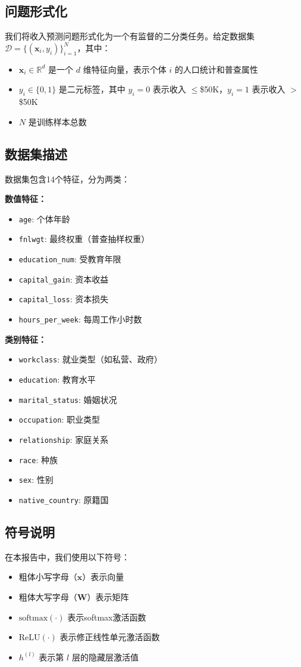 \documentclass[conference]{IEEEtran}
\begin{document}
\subsection{问题形式化}
我们将收入预测问题形式化为一个有监督的二分类任务。给定数据集 $\mathcal{D} = \{(\mathbf{x}_i, y_i)\}_{i=1}^{N}$，其中：
\begin{itemize}
    \item $\mathbf{x}_i \in \mathbb{R}^d$ 是一个 $d$ 维特征向量，表示个体 $i$ 的人口统计和普查属性
    \item $y_i \in \{0, 1\}$ 是二元标签，其中 $y_i = 0$ 表示收入 $\leq$\$50K，$y_i = 1$ 表示收入 $>$\$50K
    \item $N$ 是训练样本总数
\end{itemize}

\subsection{数据集描述}
数据集包含14个特征，分为两类：

\textbf{数值特征：}
\begin{itemize}
    \item \texttt{age}: 个体年龄
    \item \texttt{fnlwgt}: 最终权重（普查抽样权重）
    \item \texttt{education\_num}: 受教育年限
    \item \texttt{capital\_gain}: 资本收益
    \item \texttt{capital\_loss}: 资本损失
    \item \texttt{hours\_per\_week}: 每周工作小时数
\end{itemize}

\textbf{类别特征：}
\begin{itemize}
    \item \texttt{workclass}: 就业类型（如私营、政府）
    \item \texttt{education}: 教育水平
    \item \texttt{marital\_status}: 婚姻状况
    \item \texttt{occupation}: 职业类型
    \item \texttt{relationship}: 家庭关系
    \item \texttt{race}: 种族
    \item \texttt{sex}: 性别
    \item \texttt{native\_country}: 原籍国
\end{itemize}

\subsection{符号说明}
在本报告中，我们使用以下符号：
\begin{itemize}
    \item 粗体小写字母（$\mathbf{x}$）表示向量
    \item 粗体大写字母（$\mathbf{W}$）表示矩阵
    \item $\text{softmax}(\cdot)$ 表示softmax激活函数
    \item $\text{ReLU}(\cdot)$ 表示修正线性单元激活函数
    \item $h^{(l)}$ 表示第 $l$ 层的隐藏层激活值
\end{itemize}
\end{document}
